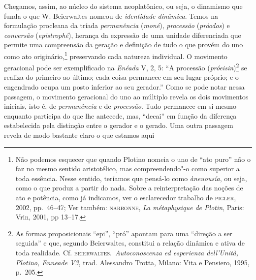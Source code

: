 Chegamos, assim, ao núcleo do sistema neoplatônico, ou seja, o
dinamismo que funda o que W. Beierwaltes nomeou de \emph{identidade
dinâmica}. Temos na formulação procleana da tríada \emph{permanência}
(\emph{moné}), \emph{processão} (\emph{próodos}) e
\emph{conversão} (\emph{epistrophé}),  herança da expressão de uma
unidade diferenciada que permite uma compreensão da geração e definição
de tudo o que provém do uno como ato originário,\footnote{ Não podemos
esquecer que quando Plotino nomeia o uno de “ato puro” não o faz no
mesmo sentido aristotélico, mas compreendendo"-o como superior a toda
essência. Nesse sentido, teríamos que pensá-lo como \emph{àneuousía},
ou seja, como o que produz a partir do nada. Sobre a reinterpretação
das noções de ato e potência, como já indicamos, ver o esclarecedor 
trabalho de \textsc{pigler}, 2002, pp.~46--47; Ver também: \textsc{narbonne},
\emph{La métaphysique de Plotin}, Paris: Vrin, 2001, pp 13--17.}
preservando cada natureza individual. O movimento geracional pode ser
exemplificado na \emph{Enéada} V, 2, 5: ``A processão
(\emph{próeisin})\footnote{ As formas proposicionais “epi”, “pró”
apontam para uma “direção a ser seguida” e que, segundo Beierwaltes,
constitui a relação dinâmica e ativa de toda realidade. Cf.
\textsc{beierwaltes}.~\emph{Autoconoscenza ed esperienza dell’Unità,
Plotino, Enneade V3}, trad. Alessandro Trotta, Milano: Vita e Pensiero,
1995, p.~205.} se realiza do primeiro ao último; cada coisa
permanece em seu lugar próprio; e o engendrado ocupa um posto inferior
ao seu gerador.'' Como se pode notar nessa passagem, o movimento
geracional do uno ao múltiplo revela os dois movimentos iniciais, isto
é, de \emph{permanência} e de \emph{processão}. Tudo permanece em
si mesmo enquanto participa do que lhe antecede, mas, “decai” em função
da diferença estabelecida pela distinção entre o gerador e o gerado.
Uma outra passagem revela de modo bastante claro o que estamos aqui

